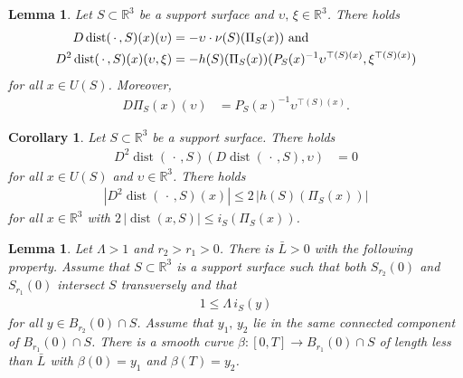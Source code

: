\documentclass[11pt]{amsart}
\newtheorem{lem}[prop]{Lemma}
\newtheorem{coro}[prop]{Corollary}
\begin{document}
\begin{appendices}
	\begin{lem}
		Let $S\subset \mathbb{R}^3$ be a support surface and $\upsilon,\,\xi\in \mathbb{R}^3$. There holds 
		\begin{align}
			D\operatorname{dist}(\,\cdot\,,S)(x)(\upsilon)&=-\upsilon\cdot \nu(S)(\Pi_S(x))\text{ and} 	\label{first distance} \\
		\notag	D^2\operatorname{dist}(\,\cdot\,,S)(x)(\upsilon,\xi)&=-h(S)(\Pi_S(x))(P_S(x)^{-1}\upsilon^{\top(S)(x)},\xi^{\top(S)(x)})
		\end{align}
 for all $x\in U(S)$.		Moreover,
			\begin{align} \label{first projection}
			D\Pi_S(x)(\upsilon)&=P_S(x)^{-1}\upsilon^{\top(S)(x)}.
		\end{align}
	\end{lem} 
		\begin{coro} 
		Let $S\subset \mathbb{R}^3$ be a support surface. There holds 
		\begin{align} 
			\label{hessian and gradient}
			D^2\operatorname{dist}(\,\cdot\,,S)(D\operatorname{dist}(\,\cdot\,,S),\upsilon )&=0
		\end{align}
		for all $x\in U(S)$ and $\upsilon \in \mathbb{R}^3$.  
There holds  
		\begin{align} \label{distance hessian estimate}
			|D^2\operatorname{dist}(\,\cdot\,,S)(x)|\leq 2\,|h(S)(\Pi_S(x))|
		\end{align}
		for all $x\in \mathbb{R}^3$ with $2\,|\operatorname{dist}(x,S)|\leq i_S(\Pi_S(x))$.
	\end{coro} 

	\begin{lem} \label{escape}
		Let $\Lambda>1$ and $r_2>r_1>0$. There is $\bar L>0$ with the following property. Assume that $S\subset \mathbb{R}^3$ is a support surface such that both $S_{r_2}(0)$ and $S_{r_1}(0)$ intersect $S$  transversely and that 
		\begin{align} \label{geometry bound escape} 
		1\leq \Lambda\,i_S(y)
		\end{align} 
		for all $y\in B_{r_2}(0)\cap S$.
 Assume that $y_1,\,y_2$ lie in the same connected component of $B_{r_1}(0)\cap S$. There is  a smooth curve $\beta:[0, T]\to B_{r_1}(0) \cap S$ of length less than $\bar L$ with $\beta(0)=y_1$ and $\beta(T)=y_2$.  
	

\end{lem}
\end{appendices}
\end{document}
